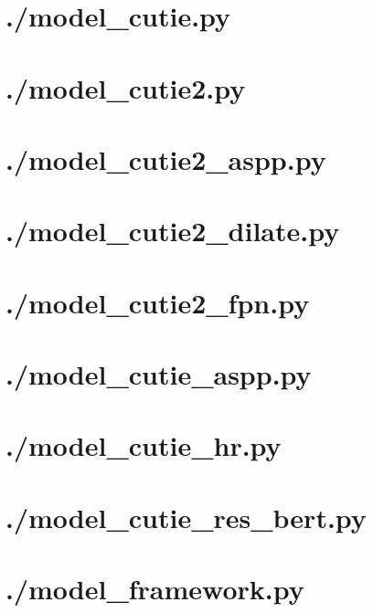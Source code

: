 \documentclass{article}
\begin{document}
    \section{./model\_cutie.py}
    
    \section{./model\_cutie2.py}
    
    \section{./model\_cutie2\_aspp.py}
    
    \section{./model\_cutie2\_dilate.py}
    
    \section{./model\_cutie2\_fpn.py}
    
    \section{./model\_cutie\_aspp.py}
    
    \section{./model\_cutie\_hr.py}
    
    \section{./model\_cutie\_res\_bert.py}
    
    \section{./model\_framework.py}
    
\end{document}
